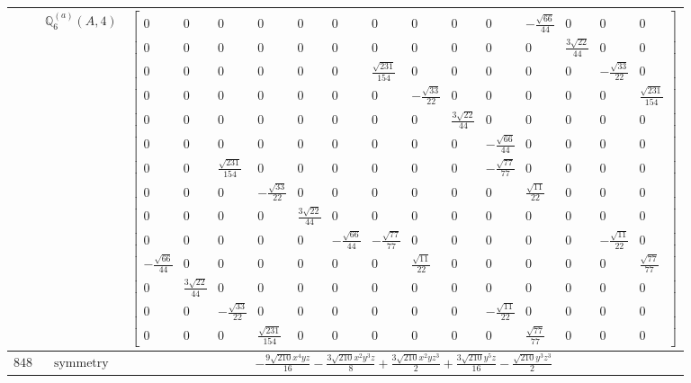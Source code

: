 \documentclass[fleqn,8pt,landscape]{jsarticle}
\begin{document}
\begin{longtable}{ccc}
$  $ & $ \mathbb{Q}_{6}^{(a)}(A,4) $ & $ \begin{bmatrix} 0 & 0 & 0 & 0 & 0 & 0 & 0 & 0 & 0 & 0 & - \frac{\sqrt{66}}{44} & 0 & 0 & 0 \\ 0 & 0 & 0 & 0 & 0 & 0 & 0 & 0 & 0 & 0 & 0 & \frac{3 \sqrt{22}}{44} & 0 & 0 \\ 0 & 0 & 0 & 0 & 0 & 0 & \frac{\sqrt{231}}{154} & 0 & 0 & 0 & 0 & 0 & - \frac{\sqrt{33}}{22} & 0 \\ 0 & 0 & 0 & 0 & 0 & 0 & 0 & - \frac{\sqrt{33}}{22} & 0 & 0 & 0 & 0 & 0 & \frac{\sqrt{231}}{154} \\ 0 & 0 & 0 & 0 & 0 & 0 & 0 & 0 & \frac{3 \sqrt{22}}{44} & 0 & 0 & 0 & 0 & 0 \\ 0 & 0 & 0 & 0 & 0 & 0 & 0 & 0 & 0 & - \frac{\sqrt{66}}{44} & 0 & 0 & 0 & 0 \\ 0 & 0 & \frac{\sqrt{231}}{154} & 0 & 0 & 0 & 0 & 0 & 0 & - \frac{\sqrt{77}}{77} & 0 & 0 & 0 & 0 \\ 0 & 0 & 0 & - \frac{\sqrt{33}}{22} & 0 & 0 & 0 & 0 & 0 & 0 & \frac{\sqrt{11}}{22} & 0 & 0 & 0 \\ 0 & 0 & 0 & 0 & \frac{3 \sqrt{22}}{44} & 0 & 0 & 0 & 0 & 0 & 0 & 0 & 0 & 0 \\ 0 & 0 & 0 & 0 & 0 & - \frac{\sqrt{66}}{44} & - \frac{\sqrt{77}}{77} & 0 & 0 & 0 & 0 & 0 & - \frac{\sqrt{11}}{22} & 0 \\ - \frac{\sqrt{66}}{44} & 0 & 0 & 0 & 0 & 0 & 0 & \frac{\sqrt{11}}{22} & 0 & 0 & 0 & 0 & 0 & \frac{\sqrt{77}}{77} \\ 0 & \frac{3 \sqrt{22}}{44} & 0 & 0 & 0 & 0 & 0 & 0 & 0 & 0 & 0 & 0 & 0 & 0 \\ 0 & 0 & - \frac{\sqrt{33}}{22} & 0 & 0 & 0 & 0 & 0 & 0 & - \frac{\sqrt{11}}{22} & 0 & 0 & 0 & 0 \\ 0 & 0 & 0 & \frac{\sqrt{231}}{154} & 0 & 0 & 0 & 0 & 0 & 0 & \frac{\sqrt{77}}{77} & 0 & 0 & 0 \end{bmatrix} $ \\ \hline
$ 848 $ & $ \text{symmetry} $ & $ - \frac{9 \sqrt{210} x^{4} y z}{16} - \frac{3 \sqrt{210} x^{2} y^{3} z}{8} + \frac{3 \sqrt{210} x^{2} y z^{3}}{2} + \frac{3 \sqrt{210} y^{5} z}{16} - \frac{\sqrt{210} y^{3} z^{3}}{2} $ \\

\end{longtable}
\end{document}
